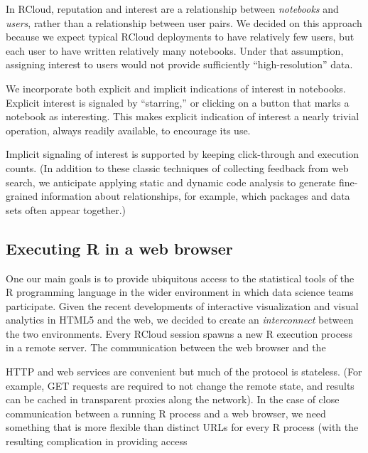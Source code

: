 In RCloud, reputation and interest are a relationship between
\emph{notebooks} and \emph{users}, rather than a relationship between
user pairs. We decided on this approach because we expect typical
RCloud deployments to have relatively few users, but each user to have
written relatively many notebooks. Under that assumption, assigning
interest to users would not provide sufficiently ``high-resolution'' data.

We incorporate both explicit and implicit indications of interest
in notebooks. Explicit interest is signaled by ``starring,'' or
clicking on a button that marks a notebook as interesting.
This makes explicit indication of interest a nearly trivial operation,
always readily available, to encourage its use.

Implicit signaling of interest is supported by keeping click-through
\cite{Joachims:2005:AIC} and execution counts. (In addition to these
classic techniques of collecting feedback from web search, we anticipate
applying static and dynamic code analysis to generate fine-grained
information about relationships, for example, which packages and data
sets often appear together.)

\subsection{Executing R in a web browser}

One our main goals is to provide ubiquitous access to the statistical
tools of the R programming language in the wider environment in which data
science teams participate.
%
Given the recent developments of interactive visualization and visual
analytics in HTML5 and the web, we decided to create an
\emph{interconnect} between the two environments.
%
Every RCloud session spawns a new R execution process in a remote
server. The communication between the web browser and the 


HTTP and web services are convenient but much of the protocol is
stateless. (For example, GET requests are required to not change the
remote state, and results can be cached in transparent proxies along
the network). In the case of close communication between a running
R process and a web browser, we need something that is more flexible
than distinct URLs for every R process (with the resulting
complication in providing access 


